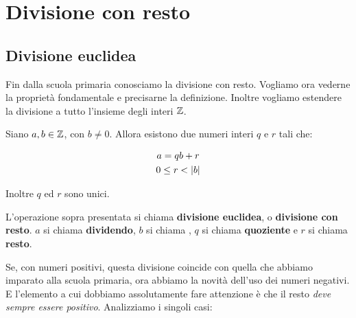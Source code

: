 \chapter{Divisione con resto}
\label{ch:divisione_con_resto}

\section{Divisione euclidea}
\label{sec:divisione_euclidea}

Fin dalla scuola primaria conosciamo la divisione con resto.
Vogliamo ora vederne la proprietà fondamentale e precisarne la definizione.
Inoltre vogliamo estendere la divisione a tutto l'insieme degli interi $ \mathbb{Z} $.

\begin{teorema}
Siano $a, b \in  \mathbb{Z} $, con $b \ne 0$.
Allora esistono due numeri interi $q$ e $r$ tali che:

\begin{gather}
    a = qb + r \\
    0 \le r <  \lvert b \rvert 
\end{gather}

Inoltre $q$ ed $r$ sono unici.
\end{teorema}

\begin{definizione}
L'operazione sopra presentata si chiama \textbf{divisione euclidea}, o \textbf{divisione con resto}. $a$
si chiama \textbf{dividendo}, $b$ si chiama , $q$ si chiama \textbf{quoziente} e $r$ si chiama \textbf{resto}.
\end{definizione}

Se, con numeri positivi, questa divisione coincide con quella che abbiamo imparato alla scuola primaria, ora abbiamo la novità dell'uso dei numeri negativi.
E l'elemento a cui dobbiamo assolutamente fare attenzione è che il resto \emph{deve sempre essere positivo}.
Analizziamo i singoli casi:

